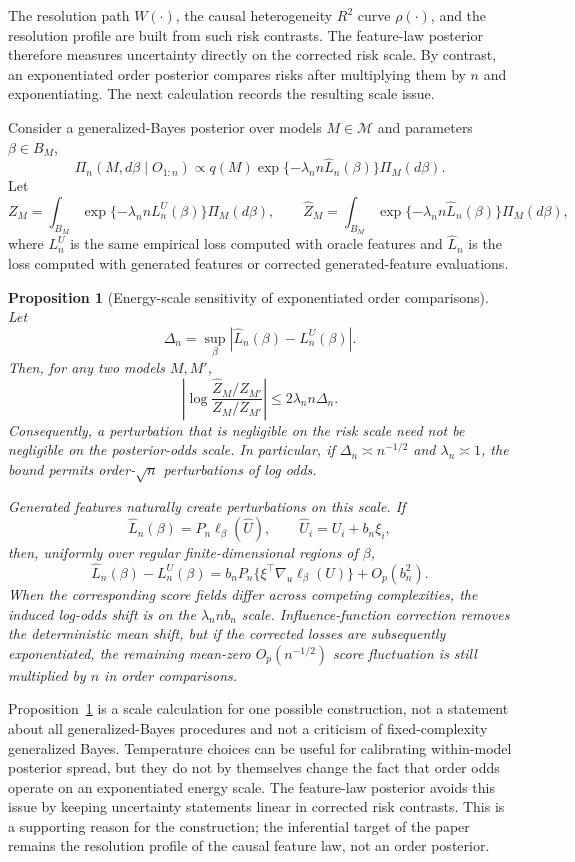 \documentclass[11pt]{article}
\newtheorem{proposition}{Proposition}
\newcommand{\calM}{\mathcal M}
\newcommand{\hU}{\widehat U}
\begin{document}
The resolution path $W(\cdot)$, the causal heterogeneity $R^2$ curve $\rho(\cdot)$, and the resolution profile are built from such risk contrasts.  The feature-law posterior therefore measures uncertainty directly on the corrected risk scale.  By contrast, an exponentiated order posterior compares risks after multiplying them by $n$ and exponentiating.  The next calculation records the resulting scale issue.

Consider a generalized-Bayes posterior \cite{bissiri2016} over models $M\in\calM$ and parameters $\beta\in B_M$,
\begin{equation}\label{eq:gibbs}
\Pi_n(M,d\beta\mid O_{1:n})
\propto
q(M)\exp\{-\lambda_n n\widehat L_n(\beta)\}\Pi_M(d\beta).
\end{equation}
Let
\[
Z_M
=
\int_{B_M}\exp\{-\lambda_n n L_n^U(\beta)\}\Pi_M(d\beta),
\qquad
\widehat Z_M
=
\int_{B_M}\exp\{-\lambda_n n \widehat L_n(\beta)\}\Pi_M(d\beta),
\]
where $L_n^U$ is the same empirical loss computed with oracle features and $\widehat L_n$ is the loss computed with generated features or corrected generated-feature evaluations.

\begin{proposition}[Energy-scale sensitivity of exponentiated order comparisons]\label{prop:fragility}
Let
\[
\Delta_n=\sup_{\beta}|\widehat L_n(\beta)-L_n^U(\beta)|.
\]
Then, for any two models $M,M'$,
\[
\left|
\log
\frac{\widehat Z_M/\widehat Z_{M'}}
     {Z_M/Z_{M'}}
\right|
\le
2\lambda_n n\Delta_n .
\]
Consequently, a perturbation that is negligible on the risk scale need not be negligible on the posterior-odds scale.  In particular, if $\Delta_n\asymp n^{-1/2}$ and $\lambda_n\asymp1$, the bound permits order-$\sqrt n$ perturbations of log odds.

Generated features naturally create perturbations on this scale.  If
\[
\widehat L_n(\beta)=P_n\ell_\beta(\hU),
\qquad
\hU_i=U_i+b_n\xi_i,
\]
then, uniformly over regular finite-dimensional regions of $\beta$,
\[
\widehat L_n(\beta)-L_n^U(\beta)
=
b_nP_n\{\xi^\top\nabla_u\ell_\beta(U)\}+O_p(b_n^2).
\]
When the corresponding score fields differ across competing complexities, the induced log-odds shift is on the $\lambda_n n b_n$ scale.  Influence-function correction removes the deterministic mean shift, but if the corrected losses are subsequently exponentiated, the remaining mean-zero $O_p(n^{-1/2})$ score fluctuation is still multiplied by $n$ in order comparisons.
\end{proposition}

Proposition~\ref{prop:fragility} is a scale calculation for one possible construction, not a statement about all generalized-Bayes procedures and not a criticism of fixed-complexity generalized Bayes.  Temperature choices can be useful for calibrating within-model posterior spread, but they do not by themselves change the fact that order odds operate on an exponentiated energy scale.  The feature-law posterior avoids this issue by keeping uncertainty statements linear in corrected risk contrasts.  This is a supporting reason for the construction; the inferential target of the paper remains the resolution profile of the causal feature law, not an order posterior.
\end{document}
